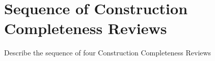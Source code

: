 \section {Sequence of Construction Completeness Reviews}

Describe the sequence of four Construction Completeness Reviews
